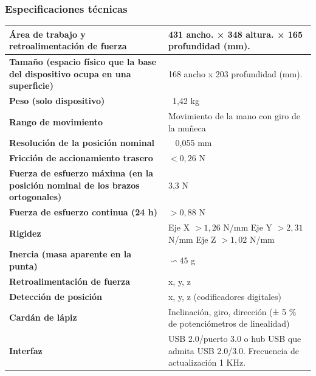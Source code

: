 \documentclass[a4paper,11pt, oneside]{book}
\begin{document}
\subsubsection{Especificaciones técnicas}
\renewcommand{\arraystretch}{1.3}
\begin{center}
	\begin{tabular}{ |m{6cm}|m{6cm}| } 
		\hline
		\textbf{Área de trabajo y retroalimentación de fuerza} & 431 ancho. × 348 altura. × 165 profundidad (mm). \\ 
		\hline
		\textbf{Tamaño (espacio físico que la base del dispositivo ocupa en una superficie)} & 168 ancho x 203 profundidad (mm).  \\ 
		\hline
		\textbf{Peso (solo dispositivo)} & ~1,42 kg  \\ 
		\hline
		\textbf{Rango de movimiento} & Movimiento de la mano con giro de la muñeca \\
		\hline
		\textbf{Resolución de la posición nominal} & ~ 0,055 mm \\
		\hline
		\textbf{Fricción de accionamiento trasero} & $< 0,26$ N \\
		\hline
		\textbf{Fuerza de esfuerzo máxima (en la posición nominal de los brazos ortogonales)} & 3,3 N \\
		\hline
		\textbf{Fuerza de esfuerzo continua (24 h)} & $>0,88$ N \\
		\hline
		\textbf{Rigidez} & \parbox[t]{11em}{Eje X $> 1,26$ N/mm \\ Eje Y $> 2,31$ N/mm  \\ Eje Z $> 1,02$ N/mm} \\
		\hline
		\textbf{Inercia (masa aparente en la punta)} & $\backsim45$ g \\
		\hline
		\textbf{Retroalimentación de fuerza} & x, y, z \\
		\hline
		\textbf{Detección de posición} & x, y, z (codificadores digitales) \\
		\hline
		\textbf{Cardán de lápiz} & Inclinación, giro, dirección (± 5 \% de potenciómetros de linealidad) \\
		\hline
		\textbf{Interfaz} & USB 2.0/puerto 3.0 o hub USB que admita USB 2.0/3.0.
		Frecuencia de actualización 1 KHz. \\
		\hline
	\end{tabular}
\end{center}
\end{document}
